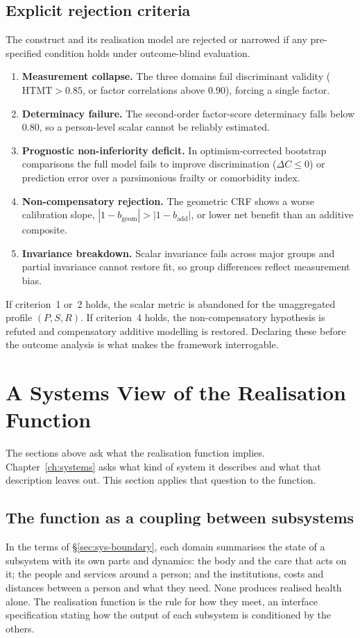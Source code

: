 \subsection{Explicit rejection criteria}
The construct and its realisation model are rejected or narrowed if any pre-specified
condition holds under outcome-blind evaluation.
\begin{enumerate}\setlength{\itemsep}{2pt}
\item \textbf{Measurement collapse.} The three domains fail discriminant validity
($\mathrm{HTMT}>0.85$, or factor correlations above $0.90$), forcing a single factor.
\item \textbf{Determinacy failure.} The second-order factor-score determinacy \citep{grice_2001} falls
below $0.80$, so a person-level scalar cannot be reliably estimated.
\item \textbf{Prognostic non-inferiority deficit.} In optimism-corrected bootstrap
comparisons the full model fails to improve discrimination ($\Delta C\le 0$) or
prediction error over a parsimonious frailty or comorbidity index.
\item \textbf{Non-compensatory rejection.} The geometric CRF shows a worse calibration
slope, $|1-b_{\text{geom}}|>|1-b_{\text{add}}|$, or lower net benefit than an additive
composite.
\item \textbf{Invariance breakdown.} Scalar invariance \citep{putnick_bornstein_2016} fails across major groups and
partial invariance cannot restore fit, so group differences reflect measurement bias.
\end{enumerate}
If criterion~1 or~2 holds, the scalar metric is abandoned for the unaggregated
profile $(P,S,R)$. If criterion~4 holds, the non-compensatory hypothesis is refuted
and compensatory additive modelling is restored. Declaring these before the outcome
analysis is what makes the framework interrogable.

\section{A Systems View of the Realisation Function}
\label{sec:E-systems}
The sections above ask what the realisation function implies.
Chapter~\ref{ch:systems} asks what kind of system it describes and what that
description leaves out. This section applies that question to the function.

\subsection{The function as a coupling between subsystems}
In the terms of \S\ref{sec:sys-boundary}, each domain summarises the state of a
subsystem with its own parts and dynamics: the body and the care that acts on
it; the people and services around a person; and the institutions, costs and
distances between a person and what they need. None produces realised health
alone. The realisation function is the rule for how they meet, an interface
specification stating how the output of each subsystem is conditioned by the
others.

